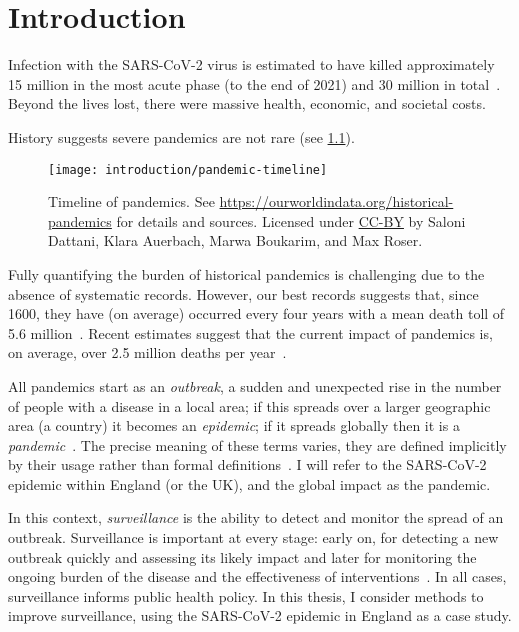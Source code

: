 \documentclass[thesis.tex]{subfiles}
\begin{document}
\chapter{Introduction} \label{intro}

Infection with the SARS-CoV-2 virus is estimated to have killed approximately 15 million in the most acute phase (to the end of 2021) and 30 million in total~\autocite{whoCOVIDExcess,economistCOVIDExcess}.
Beyond the lives lost, there were massive health, economic, and societal costs.

History suggests severe pandemics are not rare (see \cref{intro:fig:pandemic-timeline}).
\begin{figure}
    \texttt{[image: introduction/pandemic-timeline]}
    \caption[Timeline of pandemics.]{%
        Timeline of pandemics.
        See \url{https://ourworldindata.org/historical-pandemics} for details and sources.
        Licensed under \href{https://creativecommons.org/licenses/by/4.0/}{CC-BY} by Saloni Dattani, Klara Auerbach, Marwa Boukarim, and Max Roser.
    }
    \label{intro:fig:pandemic-timeline}
\end{figure}
Fully quantifying the burden of historical pandemics is challenging due to the absence of systematic records.
However, our best records suggests that, since 1600, they have (on average) occurred every four years with a mean death toll of 5.6 million~\autocite{maraniNovelEpidemics}.
Recent estimates suggest that the current impact of pandemics is, on average, over 2.5 million deaths per year~\autocite{madhavPandemicMortality}.

All pandemics start as an \emph{outbreak}, a sudden and unexpected rise in the number of people with a disease in a local area; if this spreads over a larger geographic area (\eg a country) it becomes an \emph{epidemic}; if it spreads globally then it is a \emph{pandemic}~\autocite{grennanPandemic}.
The precise meaning of these terms varies, they are defined implicitly by their usage rather than formal definitions~\autocite{morensPandemic,doshiElusive}.
I will refer to the SARS-CoV-2 epidemic within England (or the UK), and the global impact as the pandemic.

In this context, \emph{surveillance} is the ability to detect and monitor the spread of an outbreak.
Surveillance is important at every stage: early on, for detecting a new outbreak quickly and assessing its likely impact and later for monitoring the ongoing burden of the disease and the effectiveness of interventions~\autocite{whoFluSurveillance}.
In all cases, surveillance informs public health policy.
In this thesis, I consider methods to improve surveillance, using the SARS-CoV-2 epidemic in England as a case study.
\end{document}
